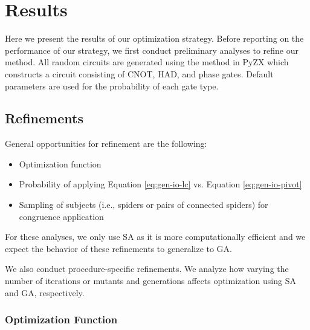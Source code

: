 \chapter[Results]{Results} \label{ch:results}

Here we present the results of our optimization strategy.
Before reporting on the performance of our strategy, we first conduct preliminary analyses to refine our method.
All random circuits are generated using the  method in PyZX which constructs a circuit consisting of CNOT, HAD, and phase gates.
Default parameters are used for the probability of each gate type.



\section{Refinements}

General opportunities for refinement are the following:
\begin{itemize}
\item
  Optimization function
\item
  Probability of applying Equation \ref{eq:gen-io-lc} vs. Equation \ref{eq:gen-io-pivot}
\item
  Sampling of subjects (i.e., spiders or pairs of connected spiders) for congruence application
\end{itemize}
For these analyses, we only use SA as it is more computationally efficient and we expect the behavior of these refinements to generalize to GA.

We also conduct procedure-specific refinements.
We analyze how varying the number of iterations or mutants and generations affects optimization using SA and GA, respectively.

\subsection*{Optimization Function}

